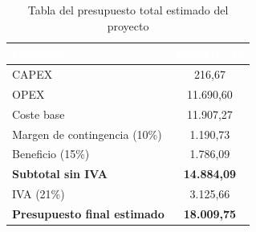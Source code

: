 \begin{table}[htp]
	\centering
	\renewcommand{\arraystretch}{1.3}
		\begin{tabular}{ | l | c |}
			\hline
			\rowcolor[HTML]{5B9BD5} 
			\textcolor{white}{\textbf{Concepto}} & \textcolor{white}{\textbf{Importe (\euro{})}} \\
			\hline
			
			CAPEX & 216,67 \\
			OPEX & 11.690,60 \\
			\hline
			Coste base & 11.907,27 \\
			Margen de contingencia (10\%) & 1.190,73 \\
			Beneficio (15\%) & 1.786,09 \\
			\hline
			\textbf{Subtotal sin IVA} & \textbf{14.884,09} \\
			IVA (21\%) & 3.125,66 \\
			\hline
			\textbf{Presupuesto final estimado} & \textbf{18.009,75} \\
			\hline
			
		\end{tabular} 
		
		\caption{Tabla del presupuesto total estimado del proyecto}
	\end{table}
